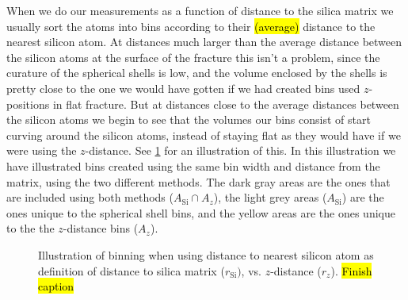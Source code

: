 When we do our measurements as a function of distance to the silica matrix we usually sort the atoms into bins according to their \hl{(average)} distance to the nearest silicon atom. At distances much larger than the average distance between the silicon atoms at the surface of the fracture this isn't a problem, since the curature of the spherical shells is low, and the volume enclosed by the shells is pretty close to the one we would have gotten if we had created bins used $z$-positions in flat fracture. But at distances close to the average distances between the silicon atoms we begin to see that the volumes our bins consist of start curving around the silicon atoms, instead of staying flat as they would have if we were using the $z$-distance. See \cref{fig:distance_to_matrix_illustration} for an illustration of this. In this illustration we have illustrated bins created using the same bin width and distance from the matrix, using the two different methods. The dark gray areas are the ones that are included using both methods ($A_\text{Si}\cap A_z$), the light grey areas ($A_\text{Si}$) are the ones unique to the spherical shell bins, and the yellow areas are the ones unique to the the $z$-distance bins ($A_z$).%
%
\begin{figure}[htpb]%
    \begin{minipage}[c]{0.6\textwidth}%
        \captionsetup{width=0.925\textwidth}%
        \centering%
        \caption{%
            Plot of the number of atoms in each bin when measuring \hl{something} as a function of distance to the \hl{silica matrix/surface of the fracture}. \hl{Finish caption}%
            \label{fig:distance_to_matrix_number_of_atoms}%
        }%
    \end{minipage}%
    \hfill%
    \begin{minipage}[c]{0.3999\textwidth}%
        \captionsetup{width=0.9\textwidth}%
        \centering%
        \caption{%
            Illustration of binning when using distance to nearest silicon atom as definition of distance to silica matrix ($r_\text{Si})$, vs. $z$-distance ($r_z$). \hl{Finish caption}%
            \label{fig:distance_to_matrix_illustration}%
        }%
    \end{minipage}%
\end{figure}%

